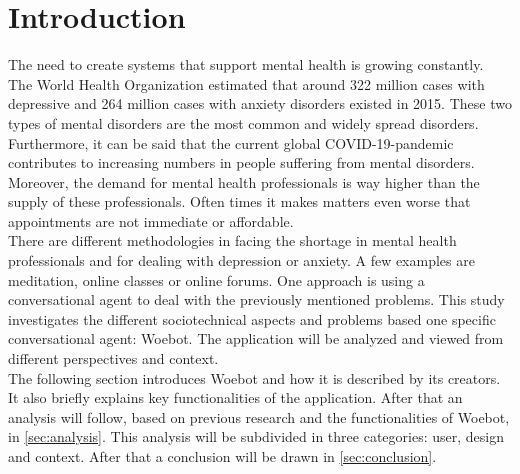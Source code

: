 \section{Introduction}
The need to create systems that support mental health is growing constantly.
The World Health Organization estimated that around 322 million cases with depressive and 264 million cases with anxiety disorders existed in 2015\cite{who2017}.
These two types of mental disorders are the most common and widely spread disorders.
Furthermore, it can be said that the current global COVID-19-pandemic contributes to increasing numbers in people suffering from mental disorders\cite{corona-mental}.
Moreover, the demand for mental health professionals is way higher than the supply of these professionals\cite{indian-shortage, rural-shortage}.
Often times it makes matters even worse that appointments are not immediate or affordable.\\

There are different methodologies in facing the shortage in mental health professionals and for dealing with depression or anxiety.
A few examples are meditation, online classes or online forums.
One approach is using a conversational agent to deal with the previously mentioned problems.
This study investigates the different sociotechnical aspects and problems based one specific conversational agent: Woebot\cite{woebot-main}.
The application will be analyzed and viewed from different perspectives and context.\\

The following section introduces Woebot and how it is described by its creators.
It also briefly explains key functionalities of the application.
After that an analysis will follow, based on previous research and the functionalities of Woebot, in \autoref{sec:analysis}.
This analysis will be subdivided in three categories: user, design and context.
After that a conclusion will be drawn in \autoref{sec:conclusion}.
